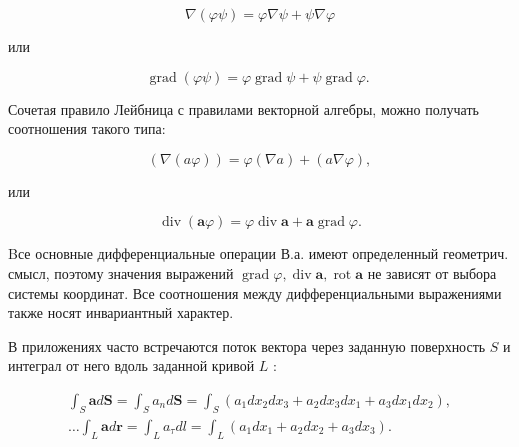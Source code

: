 \documentclass[10pt]{article}
\begin{document}
\[

\nabla(\varphi \psi)=\varphi \nabla \psi+\psi \nabla \varphi

\]



или



\[

\operatorname{grad}(\varphi \psi)=\varphi \operatorname{grad} \psi+\psi \operatorname{grad} \varphi \text {. }

\]



Сочетая правило Лейбница с правилами векторной алгебры, можно получать соотношения такого типа:



\[

(\nabla(a \varphi))=\varphi(\nabla a)+(a \nabla \varphi),

\]



или



\[

\operatorname{div}(\boldsymbol{a} \varphi)=\varphi \operatorname{div} \boldsymbol{a}+\boldsymbol{a} \operatorname{grad} \varphi .

\]



Bсе основные дифференциальные операции В.а. имеют определенный геометрич. смысл, поэтому значения выражений $\operatorname{grad} \varphi, \operatorname{div} \boldsymbol{a}, \operatorname{rot} \boldsymbol{a}$ не зависят от выбора системы координат. Все соотношения между дифференциальными выражениями также носят инвариантный характер.



В приложениях часто встречаются поток вектора через заданную поверхность $S$ и интеграл от него вдоль заданной кривой $L$ :



\[

\begin{gathered}

\int_{S} \boldsymbol{a} d \boldsymbol{S}=\int_{S} a_{n} d \boldsymbol{S}=\int_{S}\left(a_{1} d x_{2} d x_{3}+a_{2} d x_{3} d x_{1}+a_{3} d x_{1} d x_{2}\right), \\

\ldots \int_{L} \boldsymbol{a} d \boldsymbol{r}=\int_{L} a_{\tau} d l=\int_{L}\left(a_{1} d x_{1}+a_{2} d x_{2}+a_{3} d x_{3}\right) .

\end{gathered}

\]
\end{document}
